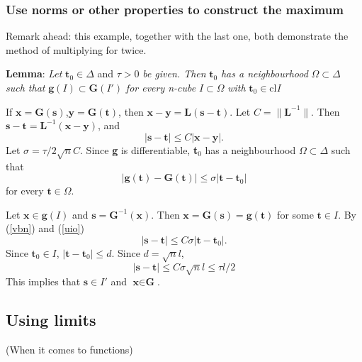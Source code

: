 \documentclass[titlepage,a4paper,12pt]{article}
\theoremstyle{nonumberplain}
\newtheorem{Proof}{\hskip 2em Proof}
\begin{document}
\subsubsection{Use norms or other properties to construct the maximum}
Remark ahead: this example, together with the last one, both demonstrate the method of multiplying for twice.\par
\textbf{Lemma}: \emph{Let} $\textbf{t}_0\in\Delta$ and $\tau>0$ \emph{be given. Then} $\textbf{t}_0$ \emph{has a neighbourhood} $\Omega\subset\Delta$ \emph{such that} $\textbf{g}(I)\subset\textbf{G}(I')$ \emph{for every n-cube} $I\subset\Omega$ \emph{with} $\textbf{t}_0\in $cl\emph{I}
\begin{Proof}
If $\textbf{x}=\textbf{G}(\textbf{s})$,$\textbf{y}=\textbf{G}(\textbf{t})$, then $\textbf{x}-\textbf{y}=\textbf{L}(\textbf{s}-\textbf{t})$. Let $C=\lVert\textbf{L}^{-1}\rVert$. Then $\textbf{s}-\textbf{t}=\textbf{L}^{-1}(\textbf{x}-\textbf{y})$, and 
\begin{equation}
|\textbf{s}-\textbf{t}|\leq C|\textbf{x}-\textbf{y}|.
\tag{*}
\label{vbn}
\end{equation}
Let $\sigma=\tau / 2\sqrt{n}C$. Since \textbf{g} is differentiable, \textbf{t}$_0$ has a neighbourhood $\Omega\subset\Delta$ such that
\begin{equation}
|\textbf{g}(\textbf{t})-\textbf{G}(\textbf{t})|\leq\sigma|\textbf{t}-\textbf{t}_0|
\tag{**}
\label{uio}
\end{equation}
for every $\textbf{t}\in\Omega$.\par
Let $\textbf{x}\in\textbf{g}(I)$ and $\textbf{s}=\textbf{G}^{-1}(\textbf{x})$. Then $\textbf{x}=\textbf{G}(\textbf{s})=\textbf{g}(\textbf{t})$ for some $\textbf{t}\in I$. By (\ref{vbn}) and (\ref{uio})
$$|\textbf{s}-\textbf{t}|\leq C\sigma|\textbf{t}-\textbf{t}_0|.$$
Since $\textbf{t}_0\in I$, $|\textbf{t}-\textbf{t}_0|\leq d$. Since $d=\sqrt{n}l$,
$$|\textbf{s}-\textbf{t}|\leq C\sigma\sqrt{n}l\leq\tau l/2$$
This implies that $\textbf{s}\in I'$ and $\textbf{x}\in\textbf{G}$.
\end{Proof}
\subsection{Using limits}(When it comes to functions)
\end{document}
